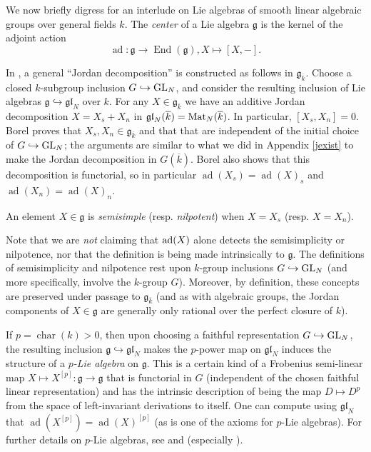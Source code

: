 \documentclass[10pt]{article}
\renewcommand{\(}{\left(}
\renewcommand{\)}{\right)}
\numberwithin{thm}{subsection}
\begin{document}
We now briefly digress for an interlude on Lie algebras of 
smooth linear algebraic groups over general fields $k$. 
The \textit{center} of a Lie algebra $\mathfrak{g}$ is the kernel
of the adjoint action
\[\operatorname{ad}:\mathfrak{g}\rightarrow\operatorname{End}(\mathfrak{g}), X\mapsto [X,-].\]

In \cite[\S4.1--\S4.4]{borel}, a general ``Jordan decomposition'' is constructed
as follows in $\mathfrak{g}_{\overline{k}}$.  Choose a closed
$k$-subgroup inclusion $G \hookrightarrow {\rm{GL}}_N$, 
and consider the resulting inclusion of
Lie algebras $\mathfrak{g} \hookrightarrow \mathfrak{gl}_N$ over $k$.
For any $X \in \mathfrak{g}_{\overline{k}}$ we have 
an additive Jordan decomposition $X = X_s + X_n$ in $\mathfrak{gl}_N(\overline{k}) =
{\rm{Mat}}_N(\overline{k})$.  In particular,  $[X_s,X_n]=0$.  Borel proves that 
$X_s, X_n \in \mathfrak{g}_{\overline{k}}$ and that that are independent of
the initial choice of $G \hookrightarrow {\rm{GL}}_N$; the arguments
are similar to what we did in Appendix \ref{jexist} to make the Jordan decomposition in $G(\overline{k})$.
Borel also shows that this decomposition is functorial,
so in particular $\operatorname{ad}(X_s)=\operatorname{ad}(X)_s$ and 
$\operatorname{ad}(X_n)=\operatorname{ad}(X)_n$.

\begin{definition}\label{ssdef}
An element $X \in \mathfrak{g}$ is 
\textit{semisimple} (resp. \textit{nilpotent})
when $X = X_s$ (resp. $X = X_n$).
\end{definition}

\begin{remark} Note that we are {\em not} claiming that 
${\rm{ad}}(X)$ alone detects the semisimplicity or nilpotence,
nor that the definition is being made intrinsically to $\mathfrak{g}$.
The definitions of semisimplicity and nilpotence rest 
upon $k$-group inclusions $G \hookrightarrow {\rm{GL}}_N$
(and more specifically, involve the $k$-group $G$).  
Moreover, by definition, these concepts are preserved
under passage to $\mathfrak{g}_{\overline{k}}$
(and as with algebraic groups, the Jordan components of
$X \in \mathfrak{g}$ are generally only rational over the perfect closure of $k$). 
\end{remark}

If $p=\operatorname{char}(k)>0$, then upon choosing a faithful representation
$G \hookrightarrow {\rm{GL}}_N$, the resulting inclusion 
$\mathfrak{g}\hookrightarrow\mathfrak{gl}_N$ makes 
 the $p$-power map on $\mathfrak{gl}_N$ induces the structure of a \textit{$p$-Lie algebra}
on $\mathfrak{g}$.  This is a certain kind of 
a Frobenius semi-linear map 
$X\mapsto X^{[p]}:\mathfrak{g}\rightarrow \mathfrak{g}$ that 
is functorial in $G$ (independent of the chosen faithful linear representation) and 
has the intrinsic description of
being the map $D\mapsto D^p$ from the space of left-invariant derivations to itself.
One can compute using $\mathfrak{gl}_N$ that $\operatorname{ad}(X^{[p]})=\operatorname{ad}(X)^{[p]}$
(as is one of the axioms for $p$-Lie algebras).
For further details on $p$-Lie algebras, see \cite[\S3.1]{borel} and 
\cite[A.7]{pred} (especially \cite[Lemma A.7.13]{pred}). 
\end{document}
